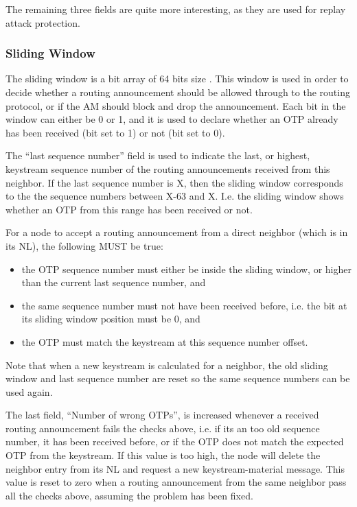 The remaining three fields are quite more interesting, as they are used for
replay attack protection.

\subsubsection*{Sliding Window}
The sliding window is a bit array of 64 bits size \cite{peterson2007computer}.
This window is used in order to decide whether a routing announcement should be
allowed through to the routing protocol, or if the \ac{AM} should block and
drop the announcement. Each bit in the window can either be 0 or 1, and it is
used to declare whether an \acf{OTP} already has been received (bit set to 1)
or not (bit set to 0).

The ``last sequence number'' field is used to indicate the last, or highest,
keystream sequence number of the routing announcements received from this
neighbor. If the last sequence number is X, then the sliding window corresponds
to the the sequence numbers between X-63 and X. I.e. the sliding window shows
whether an \ac{OTP} from this range has been received or not.

For a node to accept a routing announcement from a direct neighbor (which is in
its \ac{NL}), the following MUST be true:
\begin{itemize}
  \item the \ac{OTP} sequence number must either be inside the sliding window,
  	or higher than the current last sequence number, and
  \item the same sequence number must not have been received before, i.e. the
  	bit at its sliding window position must be 0, and
  \item the \ac{OTP} must match the keystream at this sequence number offset.
\end{itemize}
Note that when a new keystream is calculated for a neighbor, the old sliding
window and last sequence number are reset so the same sequence numbers can be
used again.

The last field, ``Number of wrong OTPs'', is increased whenever a received
routing announcement fails the checks above, i.e. if its an too old sequence
number, it has been received before, or if the \ac{OTP} does not match the
expected \ac{OTP} from the keystream. If this value is too high, the node will
delete the neighbor entry from its \ac{NL} and request a new keystream-material
message. This value is reset to zero when a routing announcement from the same
neighbor pass all the checks above, assuming the problem has been fixed.


